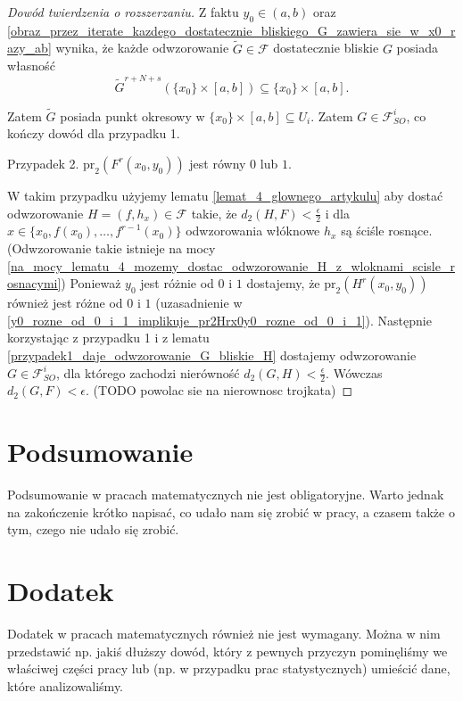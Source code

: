 \documentclass[licencjacka]{pwr_wmat_praca_dyplomowa}
\theoremstyle{plain}
\numberwithin{theorem}{chapter}
\theoremstyle{definition}
\numberwithin{theorem}{chapter}
\begin{document}
\begin{proof}[Dowód twierdzenia o rozszerzaniu]
Z faktu $y_0 \in (a, b)$ oraz \ref{obraz_przez_iterate_kazdego_dostatecznie_bliskiego_G_zawiera_sie_w_x0_razy_ab} wynika, że każde odwzorowanie $\widetilde{G} \in \mathcal{F}$ dostatecznie bliskie $G$ posiada własność
$$\widetilde{G}^{r+N+s}(\{x_0\} \times [a, b]) \subseteq \{x_0\} \times [a, b].$$


Zatem $\widetilde{G}$ posiada punkt okresowy w $\{x_0\} \times [a, b] \subseteq U_i$. Zatem $G \in \mathcal{F}_{SO}^i$, co kończy dowód dla przypadku 1.

Przypadek 2. $\textrm{pr}_2(F^r(x_0, y_0))$ jest równy $0$ lub $1$.

W takim przypadku użyjemy lematu \ref{lemat_4_glownego_artykulu} aby dostać odwzorowanie $H = (f, h_x) \in \mathcal{F}$ takie, że $d_2(H, F) < \frac{\epsilon}{2}$ i dla $x \in \{x_0, f(x_0), \ldots, f^{r-1}(x_0)\}$ odwzorowania włóknowe $h_x$ są ściśle rosnące. (Odwzorowanie takie istnieje na mocy \ref{na_mocy_lematu_4_mozemy_dostac_odwzorowanie_H_z_wloknami_scisle_rosnacymi}) Ponieważ $y_0$ jest różnie od $0$ i $1$ dostajemy, że $\textrm{pr}_2(H^r(x_0, y_0))$ również jest różne od $0$ i $1$ (uzasadnienie w \ref{y0_rozne_od_0_i_1_implikuje_pr2Hrx0y0_rozne_od_0_i_1}). Następnie korzystając z przypadku 1 i z lematu \ref{przypadek1_daje_odwzorowanie_G_bliskie_H} dostajemy odwzorowanie $G \in \mathcal{F}_{SO}^i$, dla którego zachodzi nierówność $d_2(G, H) < \frac{\epsilon}{2}$. Wówczas $d_2(G, F) < \epsilon$. (TODO powolac sie na nierownosc trojkata)


\end{proof}







{\backmatter \chapter{Podsumowanie}}
Podsumowanie w pracach matematycznych nie jest obligatoryjne. Warto jednak na zakończenie krótko napisać, co udało nam się zrobić w pracy, a czasem także o tym, czego nie udało się zrobić.

{\backmatter \chapter{Dodatek}}
Dodatek w pracach matematycznych również nie jest wymagany. Można w nim przedstawić np. jakiś dłuższy dowód, który z pewnych przyczyn pominęliśmy we właściwej części pracy lub (np. w przypadku prac statystycznych) umieścić dane, które analizowaliśmy.
\end{document}

